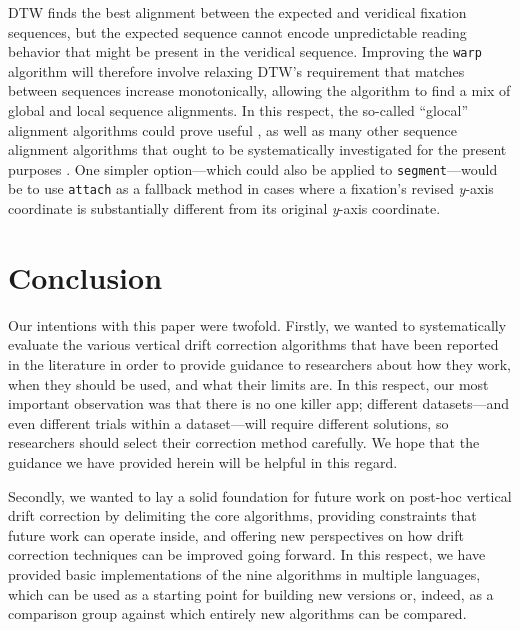 \documentclass[doc,biblatex]{apa7}
\begin{document}
DTW finds the best alignment between the expected and veridical fixation sequences, but the expected sequence cannot encode unpredictable reading behavior that might be present in the veridical sequence. Improving the \texttt{warp} algorithm will therefore involve relaxing DTW's requirement that matches between sequences increase monotonically, allowing the algorithm to find a mix of global and local sequence alignments. In this respect, the so-called ``glocal'' alignment algorithms could prove useful \parencite{Brudno:2003}, as well as many other sequence alignment algorithms that ought to be systematically investigated for the present purposes \parencite[e.g.,][]{Keogh:2001,Uchida:2005,Tomasi:2004,Tormene:2009}. One simpler option---which could also be applied to \texttt{segment}---would be to use \texttt{attach} as a fallback method in cases where a fixation's revised \textit{y}-axis coordinate is substantially different from its original \textit{y}-axis coordinate.

\section{Conclusion}

Our intentions with this paper were twofold. Firstly, we wanted to systematically evaluate the various vertical drift correction algorithms that have been reported in the literature in order to provide guidance to researchers about how they work, when they should be used, and what their limits are. In this respect, our most important observation was that there is no one killer app; different datasets---and even different trials within a dataset---will require different solutions, so researchers should select their correction method carefully. We hope that the guidance we have provided herein will be helpful in this regard.

Secondly, we wanted to lay a solid foundation for future work on post-hoc vertical drift correction by delimiting the core algorithms, providing constraints that future work can operate inside, and offering new perspectives on how drift correction techniques can be improved going forward. In this respect, we have provided basic implementations of the nine algorithms in multiple languages, which can be used as a starting point for building new versions or, indeed, as a comparison group against which entirely new algorithms can be compared.
\end{document}
